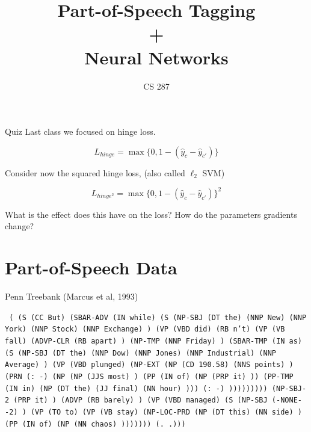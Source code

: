 \documentclass{beamer}
\title{Part-of-Speech Tagging \\ + \\ Neural Networks}
\date{}
\author{CS 287}
\begin{document}
\begin{frame}
  \titlepage
\end{frame}


\begin{frame}{Quiz}
  Last class we focused on hinge loss.

  \[L_{hinge} = \max\{0, 1 - (\hat{y}_c - \hat{y}_{c'}) \} \]

  Consider now the squared hinge loss, (also called $\ell_2$ SVM)

  \[L_{hinge^2} = \max\{0, 1 - (\hat{y}_c - \hat{y}_{c'}) \}^2 \]

  What is the effect does this have on the loss?
  How do the parameters gradients change?
\end{frame}



\section{Part-of-Speech Data}

\begin{frame}{Penn Treebank (Marcus et al, 1993)}

\lstset{ basicstyle=\ttfamily, breaklines=true}

\texttt{
( (S (CC But)
    (SBAR-ADV (IN while)
      (S
        (NP-SBJ (DT the) (NNP New) (NNP York) (NNP Stock) (NNP Exchange) )
        (VP (VBD did) (RB n't)
          (VP (VB fall)
            (ADVP-CLR (RB apart) )
            (NP-TMP (NNP Friday) )
            (SBAR-TMP (IN as)
              (S
                (NP-SBJ (DT the) (NNP Dow)
                (NNP Jones) (NNP Industrial) (NNP Average) )
                (VP (VBD plunged)
                  (NP-EXT
                    (NP (CD 190.58) (NNS points) )
                    (PRN (: -)
                      (NP
                        (NP (JJS most) )
                        (PP (IN of)
                          (NP (PRP it) ))
                        (PP-TMP (IN in)
                          (NP (DT the) (JJ final) (NN hour) )))
                      (: -) )))))))))
    (NP-SBJ-2 (PRP it) )
    (ADVP (RB barely) )
    (VP (VBD managed)
      (S
        (NP-SBJ (-NONE- -2) )
        (VP (TO to)
          (VP (VB stay)
            (NP-LOC-PRD
              (NP (DT this) (NN side) )
              (PP (IN of)
                (NP (NN chaos) )))))))
    (. .)))
}
\end{frame}
\end{document}
